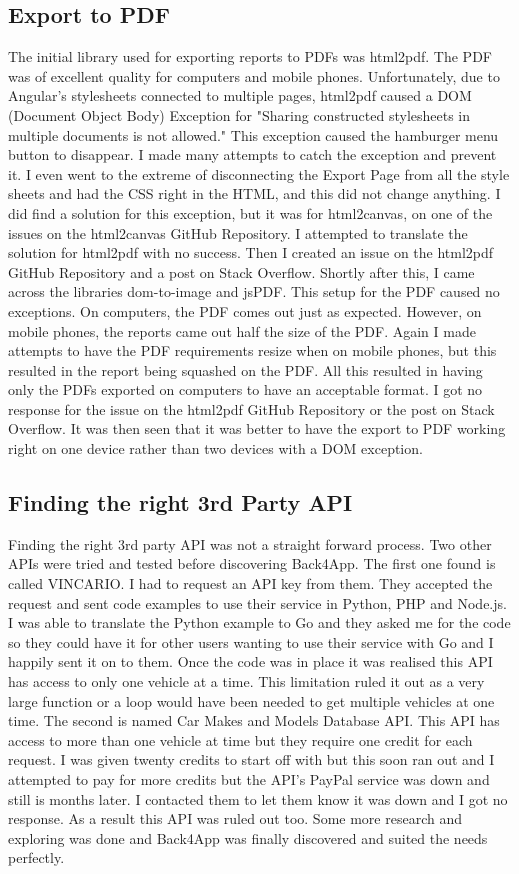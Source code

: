 \subsection{Export to PDF}
The initial library used for exporting reports to PDFs was html2pdf. The PDF was of excellent quality for computers and mobile phones. Unfortunately, due to Angular's stylesheets connected to multiple pages, html2pdf caused a DOM (Document Object Body) Exception for "Sharing constructed stylesheets in multiple documents is not allowed." This exception caused the hamburger menu button to disappear. I made many attempts to catch the exception and prevent it. I even went to the extreme of disconnecting the Export Page from all the style sheets and had the CSS right in the HTML, and this did not change anything. I did find a solution for this exception, but it was for html2canvas, on one of the issues on the html2canvas GitHub Repository. I attempted to translate the solution for html2pdf with no success. Then I created an issue on the html2pdf GitHub Repository and a post on Stack Overflow. Shortly after this, I came across the libraries dom-to-image and jsPDF. This setup for the PDF caused no exceptions. On computers, the PDF comes out just as expected. However, on mobile phones, the reports came out half the size of the PDF. Again I made attempts to have the PDF requirements resize when on mobile phones, but this resulted in the report being squashed on the PDF. All this resulted in having only the PDFs exported on computers to have an acceptable format. I got no response for the issue on the html2pdf GitHub Repository or the post on Stack Overflow. It was then seen that it was better to have the export to PDF working right on one device rather than two devices with a DOM exception.

\subsection{Finding the right 3rd Party API}
Finding the right 3rd party API was not a straight forward process. Two other APIs were tried and tested before discovering Back4App. The first one found is called VINCARIO. I had to request an API key from them. They accepted the request and sent code examples to use their service in Python, PHP and Node.js. I was able to translate the Python example to Go and they asked me for the code so they could have it for other users wanting to use their service with Go and I happily sent it on to them. Once the code was in place it was realised this API has access to only one vehicle at a time. This limitation ruled it out as a very large function or a loop would have been needed to get multiple vehicles at one time. The second is named Car Makes and Models Database API. This API has access to more than one vehicle at time but they require one credit for each request. I was given twenty credits to start off with but this soon ran out and I attempted to pay for more credits but the API's PayPal service was down and still is months later. I contacted them to let them know it was down and I got no response. As a result this API was ruled out too. Some more research and exploring was done and Back4App was finally discovered and suited the needs perfectly. 


